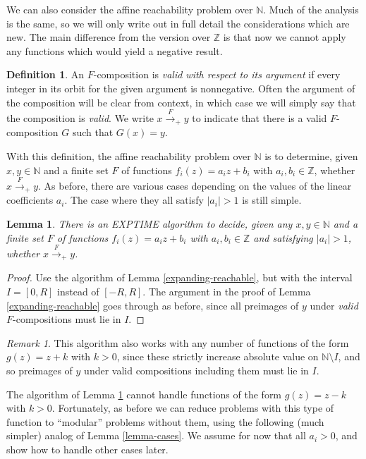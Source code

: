 \documentclass[11pt]{amsart}
\newcommand{\N}{\mathbb{N}}
\newcommand{\Z}{\mathbb{Z}}
\newtheorem{lemma}{Lemma}
\theoremstyle{definition}
\newtheorem*{definition}{Definition}
\theoremstyle{remark}
\newtheorem*{remark}{Remark}
\begin{document}
We can also consider the affine reachability problem over $\N$. Much of the analysis is the same, so we will only write out in full detail the considerations which are new. The main difference from the version over $\Z$ is that now we cannot apply any functions which would yield a negative result.
\begin{definition}
An $F$-composition is \emph{valid with respect to its argument} if every integer in its orbit for the given argument is nonnegative. Often the argument of the composition will be clear from context, in which case we will simply say that the composition is \emph{valid}. We write $x \xrightarrow{F}_+ y$ to indicate that there is a valid $F$-composition $G$ such that $G(x) = y$.
\end{definition}
With this definition, the affine reachability problem over $\N$ is to determine, given $x,y \in \N$ and a finite set $F$ of functions $f_i(z) = a_i z + b_i$ with $a_i,b_i \in \Z$, whether $x \xrightarrow{F}_+ y$. As before, there are various cases depending on the values of the linear coefficients $a_i$. The case where they all satisfy $|a_i| > 1$ is still simple.
\begin{lemma} \label{n-expanding-reachable}
There is an \textsf{EXPTIME} algorithm to decide, given any $x, y \in \N$ and a finite set $F$ of functions $f_i(z) = a_i z + b_i$ with $a_i, b_i \in \Z$ and satisfying $|a_i| > 1$, whether $x \xrightarrow{F}_+ y$.
\end{lemma}
\begin{proof}
Use the algorithm of Lemma \ref{expanding-reachable}, but with the interval $I=[0,R]$ instead of $[-R,R]$. The argument in the proof of Lemma \ref{expanding-reachable} goes through as before, since all preimages of $y$ under \emph{valid} $F$-compositions must lie in $I$.
\end{proof}
\begin{remark}
This algorithm also works with any number of functions of the form $g(z) = z + k$ with $k > 0$, since these strictly increase absolute value on $\N \setminus I$, and so preimages of $y$ under valid compositions including them must lie in $I$.
\end{remark}

The algorithm of Lemma \ref{n-expanding-reachable} cannot handle functions of the form $g(z) = z - k$ with $k > 0$. Fortunately, as before we can reduce problems with this type of function to ``modular'' problems without them, using the following (much simpler) analog of Lemma \ref{lemma-cases}. We assume for now that all $a_i > 0$, and show how to handle other cases later.
\end{document}
